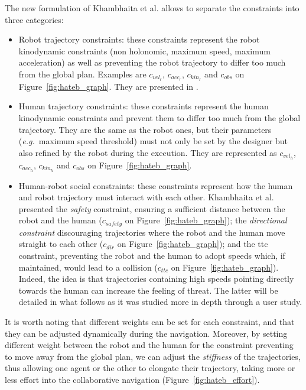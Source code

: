 \documentclass[a4paper,11pt,twoside]{StyleThese}
\begin{document}
The new formulation of Khambhaita et al. allows to separate the constraints into three categories:
\begin{itemize}
\item Robot trajectory constraints: these constraints represent the robot kinodynamic constraints (non holonomic, maximum speed, maximum acceleration) as well as preventing the robot trajectory to differ too much from the global plan. Examples are $c_{vel_{r}}$,  $c_{acc_{r}}$, $c_{kin_{r}}$ and $c_{obs}$ on Figure~\ref{fig:hateb_graph}. They are presented in \cite{rosmann_efficient_2013}.
\item Human trajectory constraints: these constraints represent the human kinodynamic constraints and prevent them to differ too much from the global trajectory. They are the same as the robot ones, but their parameters (\textit{e.g.}~maximum speed threshold) must not only be set by the designer but also refined by the robot during the execution. They are represented as $c_{vel_{h}}$,  $c_{acc_{h}}$, $c_{kin_{h}}$ and $c_{obs}$ on Figure~\ref{fig:hateb_graph}.
\item Human-robot social constraints: these constraints represent how the human and robot trajectory must interact with each other. Khambhaita et al. presented the \textit{safety} constraint, ensuring a sufficient distance between the robot and the human ($c_{safety}$ on Figure~\ref{fig:hateb_graph}); the \textit{directional constraint} discouraging trajectories where the robot and the human move straight to each other ($c_{dir}$ on Figure~\ref{fig:hateb_graph}); and the \acrfull{ttc} constraint, preventing the robot and the human to adopt speeds which, if maintained, would lead to a collision ($c_{ttc}$ on Figure~\ref{fig:hateb_graph}). Indeed, the idea is that trajectories containing high speeds pointing directly towards the human can increase the feeling of threat. The latter will be detailed in what follows as it was studied more in depth through a user study.
\end{itemize}

It is worth noting that different weights can be set for each constraint, and that they can be adjusted dynamically during the navigation. Moreover, by setting different weight between the robot and the human for the constraint preventing to move away from the global plan, we can adjust the \textit{stiffness} of the trajectories, thus allowing one agent or the other to elongate their trajectory, taking more or less effort into the collaborative navigation (Figure~\ref{fig:hateb_effort}).
\end{document}
